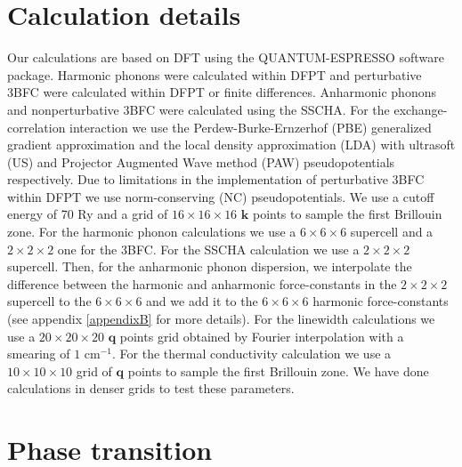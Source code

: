\section{Calculation details}

Our calculations are based on DFT using the QUANTUM-ESPRESSO\cite{giannozzi2009quantum} software package. Harmonic phonons were calculated within DFPT and perturbative 3BFC were calculated within DFPT or finite 
differences\cite{li2014shengbte}. Anharmonic phonons and nonperturbative 3BFC were calculated using the SSCHA. For the exchange-correlation interaction we use the Perdew-Burke-Ernzerhof (PBE) generalized gradient 
approximation and the local density approximation (LDA) with ultrasoft (US) and Projector Augmented Wave method (PAW) pseudopotentials respectively. Due to limitations in the implementation of perturbative 3BFC 
within DFPT we use norm-conserving (NC) pseudopotentials. We use a cutoff energy of 70 Ry and a grid of $16\times16\times16$ $\boldsymbol{k}$ points to sample the first Brillouin zone. For the harmonic phonon calculations 
we use a $6\times6\times6$ supercell and a $2\times2\times2$ one for the 3BFC. For the SSCHA calculation we use a 
$2\times2\times2$ supercell. Then, for the anharmonic phonon dispersion, we interpolate the difference between the 
harmonic and anharmonic force-constants in the $2\times2\times2$ supercell to the $6\times6\times6$ and we add it to 
the $6\times6\times6$ harmonic force-constants (see appendix \ref{appendixB} for more details). For the linewidth 
calculations we use a $20\times20\times20$ $\boldsymbol{q}$ points grid obtained by Fourier interpolation with a 
smearing of $1$ cm$^{-1}$. For the thermal conductivity calculation we use a $10\times10\times10$ grid of 
$\boldsymbol{q}$ points to sample the first Brillouin zone. We have done calculations in denser grids to test 
these parameters.

\section{Phase transition}

